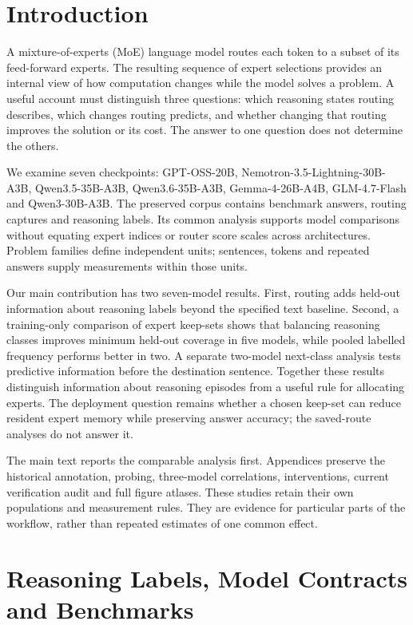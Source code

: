 \section{Introduction}

A mixture-of-experts (MoE) language model routes each token to a subset of
its feed-forward experts. The resulting sequence of expert selections
provides an internal view of how computation changes while the model
solves a problem. A useful account must distinguish three questions:
which reasoning states routing describes, which changes routing predicts,
and whether changing that routing improves the solution or its cost.
The answer to one question does not determine the others.

We examine seven checkpoints: GPT-OSS-20B, Nemotron-3.5-Lightning-30B-A3B,
Qwen3.5-35B-A3B, Qwen3.6-35B-A3B, Gemma-4-26B-A4B,
GLM-4.7-Flash and Qwen3-30B-A3B. The preserved corpus contains benchmark
answers, routing captures and reasoning labels. Its common analysis
supports model comparisons without equating expert indices or router
score scales across architectures. Problem families define independent
units; sentences, tokens and repeated answers supply measurements within
those units.

Our main contribution has two seven-model results. First, routing adds
held-out information about reasoning labels beyond the specified text
baseline. Second, a training-only comparison of expert keep-sets shows
that balancing reasoning classes improves minimum held-out coverage in
five models, while pooled labelled frequency performs better in two.
A separate two-model next-class analysis tests predictive information
before the destination sentence. Together these results distinguish
information about reasoning episodes from a useful rule for allocating
experts. The deployment question remains whether a chosen keep-set can
reduce resident expert memory while preserving answer accuracy; the
saved-route analyses do not answer it.

The main text reports the comparable analysis first. Appendices preserve
the historical annotation, probing, three-model correlations, interventions,
current verification audit and full figure atlases. These studies retain
their own populations and measurement rules. They are evidence for
particular parts of the workflow, rather than repeated estimates of one
common effect.

\section{Reasoning Labels, Model Contracts and Benchmarks}
\label{sec:analysis-design}

